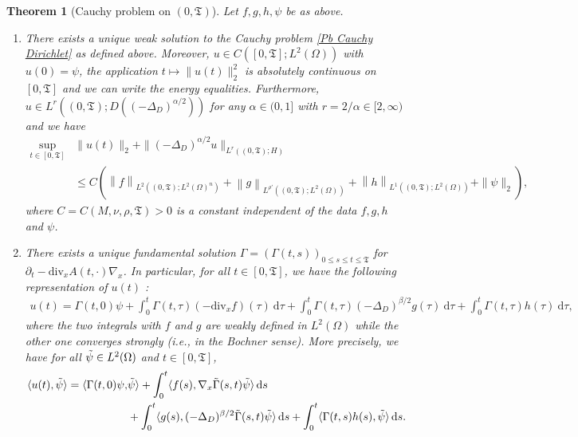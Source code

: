 \documentclass[11pt, letterpaper]{amsart}
\newtheorem{thm}{Theorem}[section]
\theoremstyle{definition}
\theoremstyle{remark}
\numberwithin{equation}{section}
\begin{document}
\begin{thm}[Cauchy problem on $(0,\mathfrak{T})$]\label{thm: Pb Cauchy Dirichlet} Let $f,g,h, \psi$ be as above. 
\begin{enumerate}
    \item 
There exists a unique  weak solution to the Cauchy problem \eqref{Pb Cauchy Dirichlet} as defined above. Moreover, $u \in C([0,\mathfrak{T}];L^2(\Omega))$ with $u(0)=\psi$, the application $t \mapsto \| u(t)  \|^2_{2}$ is absolutely continuous on $[0,\mathfrak{T}]$ and we can write the energy equalities. Furthermore, $u \in L^r((0,\mathfrak{T});D((-\Delta_D)^{\alpha/2}))$ for any $\alpha \in (0,1]$ with $r={2}/{\alpha} \in [2,\infty)$ and we have
\begin{align*}
            \sup_{t\in [0,\mathfrak{T}]} &\| u(t) \|_{2}+ \| (-\Delta_D)^{\alpha/2}u \|_{L^r((0,\mathfrak{T});H)} \\
            &\leq C  ( \left \| f \right \|_{L^2((0,\mathfrak{T});L^2(\Omega)^n)}
            + \left \| g \right \|_{L^{\rho'}((0,\mathfrak{T});L^2(\Omega))}
            + \left \| h \right \|_{L^{1}((0,\mathfrak{T});L^2(\Omega))}+ \| \psi  \|_{2}  ),
\end{align*} 
where $C=C(M,\nu,\rho,\mathfrak{T})>0$ is a constant independent of the data $f,g,h$ and $\psi$. 
\item There exists a unique fundamental solution $\Gamma=(\Gamma(t,s))_{0\leq s \leq t \leq \mathfrak{T}}$ for $\partial_t-\mathrm{div}_x A(t,\cdot)\nabla_x$. In particular,   for all $t \in [0,\mathfrak{T}]$, we have the following representation of $u(t)$ : 
\begin{align*}
    u(t) = \Gamma(t,0)\psi + \int_{0}^{t} \Gamma(t,\tau)( -\mathrm{div}_x{f})(\tau)\ \mathrm d \tau 
    + \int_{0}^{t} \Gamma(t,\tau) (-\Delta_D)^{\beta/2}{g}(\tau)\ \mathrm d \tau +\int_{0}^{t} \Gamma(t,\tau)h(\tau)\ \mathrm d \tau,
\end{align*}
where the two integrals with ${f}$ and ${g}$ are weakly defined in $L^2(\Omega)$ while the other one converges strongly (i.e., in the Bochner sense). More precisely, we have for all $\Tilde{\psi} \in L^2(\Omega)$ and $t \in [0,\mathfrak{T}]$,
 \begin{align*}
            \langle u(t) , \Tilde{\psi} \rangle = \langle \Gamma(t,0)\psi , &
            \Tilde{\psi} \rangle  
            + \int_{0}^{t} \langle {f}(s) , \nabla_x \Tilde{\Gamma}(s,t)\Tilde{\psi}\rangle \, \mathrm ds  \\&
            +\int_{0}^{t} \langle  {g}(s) , (-\Delta_D)^{\beta/2} \Tilde{\Gamma}(s,t) \Tilde{\psi} \rangle \, \mathrm ds
            +\int_{0}^{t} \langle \Gamma(t,s) h(s) , \Tilde{\psi} \rangle \, \mathrm ds.
        \end{align*}
        \end{enumerate}
\end{thm}
\end{document}

